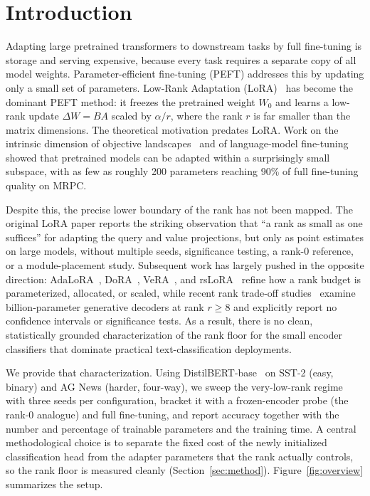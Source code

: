 \documentclass[conference]{IEEEtran}
\begin{document}
\section{Introduction}
Adapting large pretrained transformers to downstream tasks by full fine-tuning is storage and serving expensive, because every task requires a separate copy of all model weights. Parameter-efficient fine-tuning (PEFT) addresses this by updating only a small set of parameters. Low-Rank Adaptation (LoRA)~\cite{hu2021lora} has become the dominant PEFT method: it freezes the pretrained weight $W_0$ and learns a low-rank update $\Delta W = BA$ scaled by $\alpha/r$, where the rank $r$ is far smaller than the matrix dimensions. The theoretical motivation predates LoRA. Work on the intrinsic dimension of objective landscapes~\cite{li2018intrinsic} and of language-model fine-tuning~\cite{aghajanyan2020intrinsic} showed that pretrained models can be adapted within a surprisingly small subspace, with as few as roughly 200 parameters reaching 90\% of full fine-tuning quality on MRPC.

Despite this, the precise lower boundary of the rank has not been mapped. The original LoRA paper reports the striking observation that ``a rank as small as one suffices'' for adapting the query and value projections, but only as point estimates on large models, without multiple seeds, significance testing, a rank-0 reference, or a module-placement study. Subsequent work has largely pushed in the opposite direction: AdaLoRA~\cite{zhang2023adalora}, DoRA~\cite{liu2024dora}, VeRA~\cite{kopiczko2023vera}, and rsLoRA~\cite{kalajdzievski2023rslora} refine how a rank budget is parameterized, allocated, or scaled, while recent rank trade-off studies~\cite{biderman2024lora,rathore2025rank} examine billion-parameter generative decoders at rank $r \geq 8$ and explicitly report no confidence intervals or significance tests. As a result, there is no clean, statistically grounded characterization of the rank floor for the small encoder classifiers that dominate practical text-classification deployments.

We provide that characterization. Using DistilBERT-base~\cite{sanh2019distilbert} on SST-2 (easy, binary) and AG News (harder, four-way), we sweep the very-low-rank regime with three seeds per configuration, bracket it with a frozen-encoder probe (the rank-0 analogue) and full fine-tuning, and report accuracy together with the number and percentage of trainable parameters and the training time. A central methodological choice is to separate the fixed cost of the newly initialized classification head from the adapter parameters that the rank actually controls, so the rank floor is measured cleanly (Section~\ref{sec:method}). Figure~\ref{fig:overview} summarizes the setup.
\end{document}
